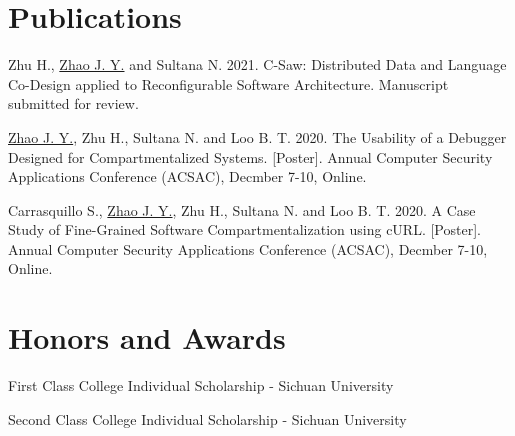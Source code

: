 \documentclass[a4paper]{article}
\begin{document}
\vspace{-5pt}
\section{Publications}
\begin{description}[font=$\bullet$,leftmargin=!]
  \item \small{Zhu H., \underline{Zhao J. Y.} and Sultana N. 2021. C-Saw:
          Distributed Data and Language Co-Design applied to Reconfigurable
          Software Architecture. Manuscript submitted for review.}
  \item \small{\underline{Zhao J. Y.}, Zhu H., Sultana N. and Loo B. T. 2020.
          The Usability of a Debugger Designed for Compartmentalized Systems.
            [Poster]. Annual Computer Security Applications Conference (ACSAC),
          Decmber 7-10, Online.}
  \item \small{Carrasquillo S., \underline{Zhao J. Y.}, Zhu H., Sultana N. and
          Loo B. T. 2020. A Case Study of Fine-Grained Software
          Compartmentalization using cURL. [Poster]. Annual Computer Security
          Applications Conference (ACSAC), Decmber 7-10, Online.}
\end{description}
\vspace{-5pt}

\section{Honors and Awards}
\begin{description}[font=$\bullet$]
  \item {First Class College Individual Scholarship - Sichuan University}
        \vspace{-5pt}
  \item {Second Class College Individual Scholarship - Sichuan University}
        \vspace{-5pt}
\end{description}
\end{document}
